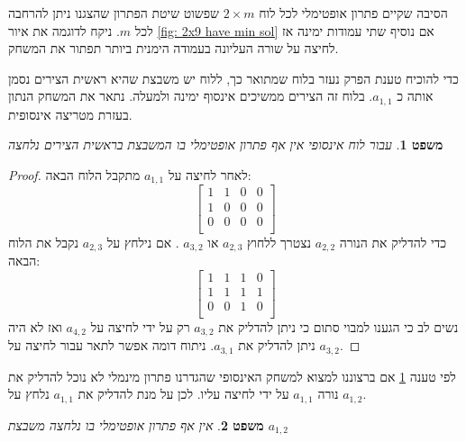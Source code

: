 \documentclass[12pt,leqno]{article}
\theoremstyle{theoremdd}
\newtheorem{theorem}{משפט}[section]
\begin{document}
הסיבה שקיים פתרון אופטימלי לכל לוח 
$2 \times m$
שפשוט שיטת הפתרון שהצגנו ניתן להרחבה לכל 
$m$.
ניקח לדוגמה את איור 
\ref{fig: 2x9 have min sol}
אם נוסיף שתי עמודות ימינה 
אז לחיצה על שורה העליונה 
בעמודה הימנית ביותר תפתור את המשחק.

כדי להוכיח טענת הפרק נעזר בלוח שמתואר כך,
ללוח יש משבצת שהיא ראשית הצירים 
נסמן אותה כ 
$a_{1,1}$.
בלוח זה  הצירים ממשיכים אינסוף ימינה ולמעלה.
נתאר את המשחק הנתון בעזרת מטריצה אינסופית.
\begin{theorem}
    \label{thm:cant-press-a11}
    עבור לוח אינסופי
    אין אף פתרון 
    אופטימלי בו המשבצת בראשית הצירים נלחצה 
\end{theorem}
\begin{proof}
    לאחר לחיצה על 
    $a_{1,1}$
    מתקבל הלוח הבאה:
    \[
        \begin{bmatrix}
            1 & 1 & 0 & 0 \\
            1 & 0 & 0 & 0 \\
            0 & 0 & 0 & 0 \\
        \end{bmatrix}
    \]
    כדי להדליק 
    את הנורה
    $a_{2,2}$
    נצטרך 
    ללחוץ
    $a_{2,3}$
    או 
    $a_{3,2}$
    .
    אם נילחץ על
   $a_{2,3}$
   נקבל את הלוח הבאה:
   \[
        \begin{bmatrix}
            1 & 1 & 1 & 0 \\
            1 & 1 & 1 & 1 \\
            0 & 0 & 1 & 0 \\
        \end{bmatrix}
    \]
    נשים לב כי הגענו למבוי סתום כי
    ניתן להדליק את 
    $a_{3,2}$
    רק על ידי לחיצה על 
   $a_{4,2}$ 
   ואז לא היה ניתן להדליק את 
   $a_{3,1}$.
   ניתוח דומה אפשר לתאר עבור 
   לחיצה על 
   $a_{3,2}$.
\end{proof}
לפי טענה
\ref{thm:cant-press-a11}
אם ברצוננו למצוא למשחק האינסופי שהגדרנו פתרון מינמלי לא נוכל 
להדליק את נורה 
$a_{1,1}$
על ידי לחיצה עליו.
לכן על מנת להדליק את 
$a_{1,1}$
נלחץ על 
$a_{1,2}$.
\begin{theorem}
    \label{thm:cant-press-a12}
    אין אף פתרון 
    אופטימלי בו נלחצה 
    משבצת
    $a_{1,2}$
\end{theorem}
\end{document}
